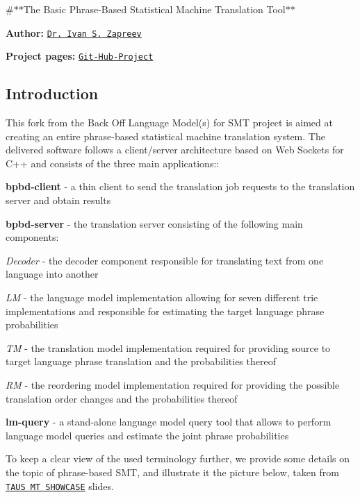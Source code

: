 \#$\ast$$\ast$\+The Basic Phrase-\/\+Based Statistical Machine Translation Tool$\ast$$\ast$

{\bfseries Author\+:} \href{https://nl.linkedin.com/in/zapreevis}{\tt Dr. Ivan S. Zapreev}

{\bfseries Project pages\+:} \href{https://github.com/ivan-zapreev/Back-Off-Language-Model-SMT}{\tt Git-\/\+Hub-\/\+Project}

\subsection*{Introduction}

This fork from the Back Off Language Model(s) for S\+M\+T project is aimed at creating an entire phrase-\/based statistical machine translation system. The delivered software follows a client/server architecture based on Web Sockets for C++ and consists of the three main applications\+:\+:


\begin{DoxyItemize}
\item {\bfseries bpbd-\/client} -\/ a thin client to send the translation job requests to the translation server and obtain results
\item {\bfseries bpbd-\/server} -\/ the translation server consisting of the following main components\+:
\begin{DoxyItemize}
\item {\itshape Decoder} -\/ the decoder component responsible for translating text from one language into another
\item {\itshape L\+M} -\/ the language model implementation allowing for seven different trie implementations and responsible for estimating the target language phrase probabilities
\item {\itshape T\+M} -\/ the translation model implementation required for providing source to target language phrase translation and the probabilities thereof
\item {\itshape R\+M} -\/ the reordering model implementation required for providing the possible translation order changes and the probabilities thereof
\end{DoxyItemize}
\item {\bfseries lm-\/query} -\/ a stand-\/alone language model query tool that allows to perform language model queries and estimate the joint phrase probabilities
\end{DoxyItemize}

To keep a clear view of the used terminology further, we provide some details on the topic of phrase-\/based S\+M\+T, and illustrate it the picture below, taken from \href{http://www.slideshare.net/TAUS/10-april-2013-taus-mt-showcase-mt-for-southeast-asian-languages-aw-ai-ti-institute-for-infocomm-18665069}{\tt T\+A\+U\+S M\+T S\+H\+O\+W\+C\+A\+S\+E} slides.



